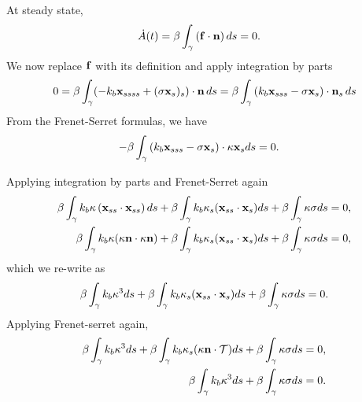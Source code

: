 \documentclass[aps,prl,showpacs]{revtex4}
\begin{document}
At steady state,
\begin{align}
    \dot{A}(t) &= \beta \int_{\gamma}\left(\mathbf{f}\cdot\mathbf{n}\right)ds =0.
\end{align}
We now replace $\mathbf{f}$ with its definition and apply integration by parts
\begin{align}
   0=\beta\int_{\gamma} 
    (-k_b\mathbf{x}_{ssss}+(\sigma\mathbf{x}_s)_s)\cdot\mathbf{n}\, ds =
   \beta\int_{\gamma}\left(k_b\mathbf{x}_{sss}-\sigma\mathbf{x}_s\right)\cdot
     \mathbf{n}_s\, ds
\end{align}
From the Frenet-Serret formulas, we have 
\begin{align}
     -\beta\int_{\gamma}
     \left(k_b\mathbf{x}_{sss}-\sigma\mathbf{x}_s\right)\cdot\kappa\mathbf{x}_s ds &=0.
\end{align}

Applying integration by parts and Frenet-Serret again
\begin{align}
     \beta\int_{\gamma}
     k_b\kappa\left(\mathbf{x}_{ss}\cdot\mathbf{x}_{ss}\right)ds + \beta
     \int_{\gamma} k_b \kappa_s(\mathbf{x}_{ss} \cdot \mathbf{x}_s)ds +\beta\int_{\gamma}\kappa\sigma ds  &= 0,\\
    \beta\int_{\gamma} k_b\kappa(\kappa\mathbf{n} \cdot
     \kappa\mathbf{n})+ \beta \int_{\gamma} k_b \kappa_s(\mathbf{x}_{ss} \cdot
     \mathbf{x}_s)ds +\beta\int_{\gamma}\kappa\sigma ds &= 0,
\end{align}
which we re-write as
\begin{align}
   \beta\int_{\gamma}k_b\kappa^3 ds + \beta \int_{\gamma} k_b
   \kappa_s(\mathbf{x}_{ss} \cdot \mathbf{x}_s)ds +\beta\int_{\gamma} \kappa\sigma ds = 0.
\end{align}
Applying Frenet-serret again,
\begin{align}
    \beta\int_{\gamma}k_b\kappa^3 ds + \beta \int_{\gamma} k_b
    \kappa_s(\kappa\mathbf{n} \cdot \mathcal{T})ds +\beta\int_{\gamma} \kappa\sigma ds = 0, \\
    \beta\int_{\gamma}k_b\kappa^3 ds +\beta\int_{\gamma} \kappa\sigma ds  = 0.
\end{align}
\end{document}
